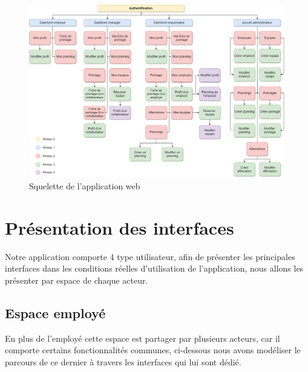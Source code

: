 \clearpage
\thispagestyle{empty}
\begin{landscape}
    \begin{figure}[h!]
        \centering
        \includegraphics[scale=0.44 ]{images/interface/arbre.png}
        \caption{Squelette de l'application web}
        \label{fig90}
    \end{figure}  
\end{landscape}

\clearpage

\section{Présentation des interfaces}
Notre application comporte 4 type utilisateur, afin de présenter les principales interfaces dans
les conditions réelles d’utilisation de l’application, nous allons les présenter par espace de chaque
acteur.

\subsection{Espace employé}
En plus de l’employé cette espace est partager par plusieurs acteurs, car il comporte certains
fonctionnalités communes, ci-dessous nous avons modéliser le parcours de ce dernier à travers les
interfaces qui lui sont dédié.

